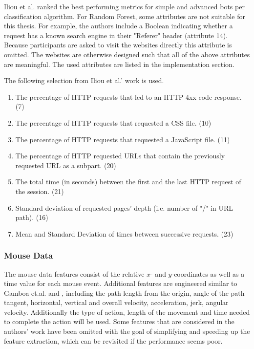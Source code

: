 \documentclass[
    fontsize=12pt,
    headings=small,
    parskip=half,           %
    bibliography=totoc,
    numbers=noenddot,       %
    open=any,               %
    final,                   %
    table
]{scrreprt}
\begin{document}
Iliou et al. \cite{10.1145/3339252.3339267} ranked the best performing metrics for simple and advanced bots per classification algorithm. For Random Forest, some attributes are not suitable for this thesis. For example, the authors include a Boolean indicating whether a request has a known search engine in their "Referer" header (attribute 14). Because participants are asked to visit the websites directly this attribute is omitted. The websites are otherwise designed such that all of the above attributes are meaningful. The used attributes are listed in the implementation section.

The following selection from Iliou et al.' work \cite{10.1145/3339252.3339267} is used.

\begin{enumerate}
    \item The percentage of HTTP requests that led to an HTTP 4xx code response. (7)
    \item The percentage of HTTP requests that requested a CSS file. (10)
    \item The percentage of HTTP requests that requested a JavaScript file. (11)
    \item The percentage of HTTP requested URLs that contain the previously requested URL as a subpart. (20)
    \item The total time (in seconds) between the first and the last HTTP request of the session. (21)
    \item Standard deviation of requested pages' depth (i.e. number of "/" in URL path). (16)
    \item Mean and Standard Deviation of times between successive requests. (23)
\end{enumerate}

\label{concept_mouse_data}
\subsubsection{Mouse Data}

The mouse data features consist of the relative $x$- and $y$-coordinates as well as a time value for each mouse event. Additional features are engineered similar to Gamboa et.al.\cite{GAMBOA2004} and \cite{https://doi.org/10.1049/iet-bmt.2018.5126}, including the path length from the origin, angle of the path tangent, horizontal, vertical and overall velocity, acceleration, jerk, angular velocity. Additionally the type of action, length of the movement and time needed to complete the action will be used. Some features that are considered in the authors' work have been omitted with the goal of simplifying and speeding up the feature extraction, which can be revisited if the performance seems poor.
\end{document}
